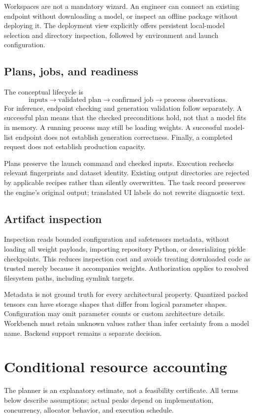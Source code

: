 \documentclass[10pt]{article}
\begin{document}
Workspaces are not a mandatory wizard. An engineer can connect an existing endpoint without downloading a model, or inspect an offline package without deploying it. The deployment view explicitly offers persistent local-model selection and directory inspection, followed by environment and launch configuration.

\subsection{Plans, jobs, and readiness}
The conceptual lifecycle is
\[
\text{inputs} \longrightarrow \text{validated plan} \longrightarrow
\text{confirmed job} \longrightarrow \text{process observations}.
\]
For inference, endpoint checking and generation validation follow separately. A successful plan means that the checked preconditions hold, not that a model fits in memory. A running process may still be loading weights. A successful model-list endpoint does not establish generation correctness. Finally, a completed request does not establish production capacity.

Plans preserve the launch command and checked inputs. Execution rechecks relevant fingerprints and dataset identity. Existing output directories are rejected by applicable recipes rather than silently overwritten. The task record preserves the engine's original output; translated UI labels do not rewrite diagnostic text.

\subsection{Artifact inspection}
Inspection reads bounded configuration and safetensors metadata, without loading all weight payloads, importing repository Python, or deserializing pickle checkpoints. This reduces inspection cost and avoids treating downloaded code as trusted merely because it accompanies weights. Authorization applies to resolved filesystem paths, including symlink targets.

Metadata is not ground truth for every architectural property. Quantized packed tensors can have storage shapes that differ from logical parameter shapes. Configuration may omit parameter counts or custom architecture details. Workbench must retain unknown values rather than infer certainty from a model name. Backend support remains a separate decision.

\section{Conditional resource accounting}
The planner is an explanatory estimate, not a feasibility certificate. All terms below describe assumptions; actual peaks depend on implementation, concurrency, allocator behavior, and execution schedule.
\end{document}

